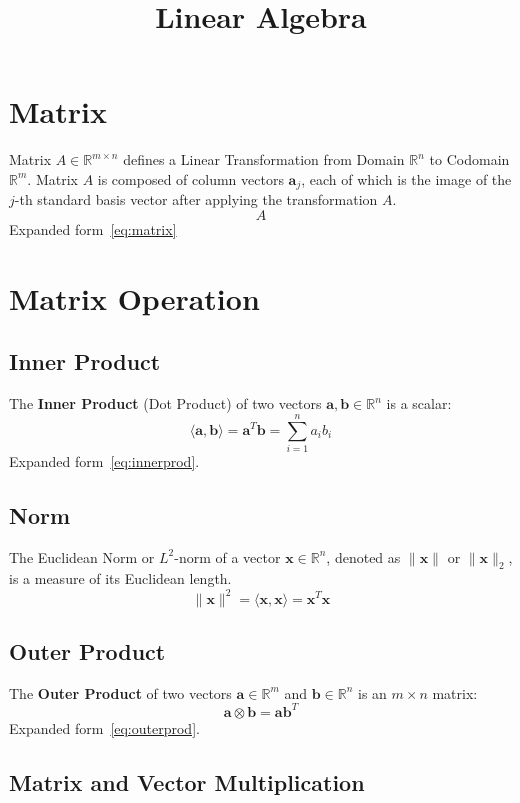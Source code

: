 \documentclass{article}
\title{Linear Algebra}
\date{}
\begin{document}
\maketitle

\tableofcontents

\newpage
\section{Matrix}
Matrix $A \in \mathbb{R}^{m \times n}$ defines a Linear Transformation from Domain $\mathbb{R}^n$ to Codomain $\mathbb{R}^m$.
\newline
Matrix $A$ is composed of column vectors $\mathbf{a}_j$, each of which is the image of the $j$-th standard basis vector after applying the transformation $A$.
\[
    A
\]
Expanded form~\ref{eq:matrix}


\newpage
\section{Matrix Operation}

\subsection{Inner Product}
The \textbf{Inner Product} (Dot Product) of two vectors $\mathbf{a}, \mathbf{b} \in \mathbb{R}^n$ is a scalar:
\[
    \langle \mathbf{a}, \mathbf{b} \rangle = \mathbf{a}^T \mathbf{b} = \sum_{i=1}^n a_i b_i
\]
Expanded form~\ref{eq:innerprod}.

\subsection{Norm}
The Euclidean Norm or $L^2$-norm of a vector $\mathbf{x} \in \mathbb{R}^n$, denoted as $\|\mathbf{x}\|$ or $\|\mathbf{x}\|_2$, is a measure of its Euclidean length.
\[
    \|\mathbf{x}\|^2 = \langle \mathbf{x}, \mathbf{x} \rangle = \mathbf{x}^T \mathbf{x}
\]

\subsection{Outer Product}
The \textbf{Outer Product} of two vectors $\mathbf{a} \in \mathbb{R}^m$ and $\mathbf{b} \in \mathbb{R}^n$ is an $m \times n$ matrix:
\[
    \mathbf{a} \otimes \mathbf{b} = \mathbf{a} \mathbf{b}^T
\]
Expanded form~\ref{eq:outerprod}.

\subsection{Matrix and Vector Multiplication}
\end{document}
